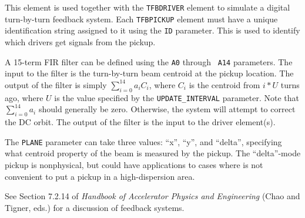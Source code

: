 This element is used together with the {\tt TFBDRIVER} element to
simulate a digital turn-by-turn feedback system.  Each {\tt TFBPICKUP}
element must have a unique identification string assigned to it using
the {\tt ID} parameter.  This is used to identify which drivers get
signals from the pickup.

A 15-term FIR filter can be defined using the {\tt A0} through {\tt
A14} parameters.  The input to the filter is the turn-by-turn beam
centroid at the pickup location.  The output of the filter is simply
$\sum_{i=0}^{14} a_i C_i$, where $C_i$ is the centroid from $i*U$ turns
ago, where $U$ is the value specified by the \verb|UPDATE_INTERVAL| parameter.
Note that $\sum_{i=0}^{14} a_i$ should generally be zero. Otherwise, the
system will attempt to correct the DC orbit.  The output of the filter
is the input to the driver element(s).

The \verb|PLANE| parameter can take three values: ``x'', ``y'', and ``delta'', specifying
what centroid property of the beam is measured by the pickup. The ``delta''-mode pickup
is nonphysical, but could have applications to cases where is not convenient to put a 
pickup in a high-dispersion area.

See Section 7.2.14 of {\em Handbook of Accelerator Physics and Engineering}
(Chao and Tigner, eds.) for a discussion of feedback systems.
